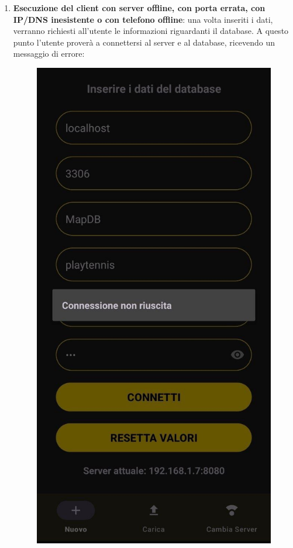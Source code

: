 \begin{enumerate}
\begin{figure}[H]
  \end{figure}
  \item \textbf{Esecuzione del client con server offline, con porta errata, con IP/DNS inesistente o con telefono offline}: una volta inseriti i dati, verranno richiesti all'utente le informazioni riguardanti il database. A questo punto l'utente proverà a connettersi al server e al database, ricevendo un messaggio di errore:
  \begin{figure}[H]
    \centering
    \includegraphics[scale=0.2]{img/app2.png}

\end{figure}
\end{enumerate}
